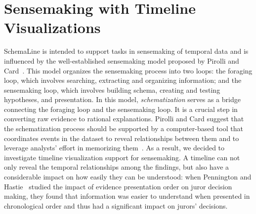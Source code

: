 \section{Sensemaking with Timeline Visualizations}
\label{sec:design}

SchemaLine is intended to support tasks in sensemaking of temporal data and is influenced by the well-established sensemaking model proposed by Pirolli and Card~\cite{Pirolli2005}. This model organizes the sensemaking process into two loops: the foraging loop, which involves searching, extracting and organizing information; and the sensemaking loop, which involves building schema, creating and testing hypotheses, and presentation. In this model, \emph{schematization} serves as a bridge connecting the foraging loop and the sensemaking loop. It is a crucial step in converting raw evidence to rational explanations. Pirolli and Card suggest that the schematization process should be supported by a computer-based tool that coordinates events in the dataset to reveal relationships between them and to leverage analysts' effort in memorizing them~\cite{Pirolli2005}. As a result, we decided to investigate timeline visualization support for sensemaking. A timeline can not only reveal the temporal relationships among the findings, but also have a considerable impact on how easily they can be understood: when Pennington and Hastie~\cite{Pennington1991} studied the impact of evidence presentation order on juror decision making, they found that information was easier to understand when presented in chronological order and thus had a significant impact on jurors' decisions. 




